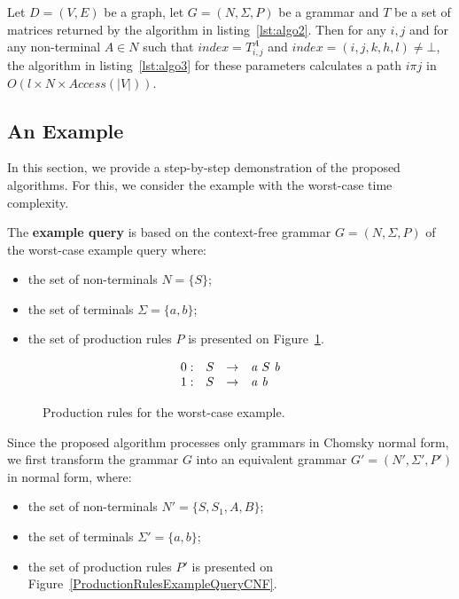 \begin{myproposition}\label{thm:time_extraction}
	Let $D = (V,E)$ be a graph, let $G =(N,\Sigma,P)$ be a grammar and $T$ be a set of matrices returned by the algorithm in listing~\ref{lst:algo2}. Then for any $i, j$ and for any non-terminal $A \in N$ such that $index = T^A_{i,j}$ and $index = (i,j,k,h,l) \neq \bot$, the algorithm in listing~\ref{lst:algo3} for these parameters calculates a path $i \pi j$ in $O(l \times N \times Access(|V|))$.
\end{myproposition}

\subsection{An Example}
In this section, we provide a step-by-step demonstration of the proposed algorithms. For this, we consider the example with the worst-case time complexity.

The \textbf{example query} is based on the context-free grammar $G = (N, \Sigma, P)$ of the worst-case example query where:
\begin{itemize}
	\item the set of non-terminals $N = \{S\}$;
	\item the set of terminals $\Sigma = \{a, b\}$;
	\item the set of production rules $P$ is presented on Figure~\ref{ProductionRulesWorsCaseExample}.
\end{itemize}

\begin{figure}[h]
	\[
	\begin{array}{rccl}
	0: & S & \rightarrow & \text{\emph{a}} \ S \ \text{\emph{b}} \\
	1: & S & \rightarrow & \text{\emph{a}} \ \text{\emph{b}} \\ 
	\end{array}
	\]
	\caption{Production rules for the worst-case example.}
	\label{ProductionRulesWorsCaseExample}
\end{figure}

Since the proposed algorithm processes only grammars in Chomsky normal form, we first transform the grammar $G$ into an equivalent grammar $G' = (N', \Sigma', P')$ in normal form, where:
\begin{itemize}
	\item the set of non-terminals $N' = \{S, S_1, A, B\}$;
	\item the set of terminals $\Sigma' = \{a, b\}$;
	\item the set of production rules $P'$ is presented on Figure~\ref{ProductionRulesExampleQueryCNF}.
\end{itemize}

